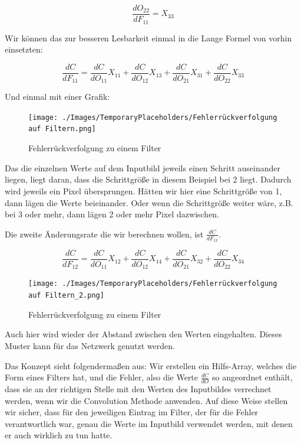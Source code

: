 \documentclass[12pt]{article}
\begin{document}
$$\frac{dO_{22}} {dF_{11}} = X_{33}$$

Wir können das zur besseren Lesbarkeit einmal in die Lange Formel von vorhin einsetzten:

$$
\frac{dC}{dF_{11}} = 
\frac{dC} {dO_{11}} X_{11}+
\frac{dC} {dO_{12}} X_{13}+
\frac{dC} {dO_{21}} X_{31}+
\frac{dC} {dO_{22}} X_{33}
$$

Und einmal mit einer Grafik:

\begin{figure}[H]
\centering
\texttt{[image: ./Images/TemporaryPlaceholders/Fehlerrückverfolgung auf Filtern.png]}
\caption{Fehlerrückverfolgung zu einem Filter}
\label{Fehlerrückverfolgung zu einem Filter v1}
\end{figure}

Das die einzelnen Werte auf dem Inputbild jeweils einen Schritt auseinander liegen, liegt daran, dass die Schrittgröße in diesem Beispiel bei 2 liegt. Dadurch wird jeweils ein Pixel übersprungen. Hätten wir hier eine Schrittgröße von 1, dann lägen die Werte beieinander. Oder wenn die Schrittgröße weiter wäre, z.B. bei 3 oder mehr, dann lägen 2 oder mehr Pixel dazwischen.

Die zweite Änderungsrate die wir berechnen wollen, ist $\frac{dC}{dF_{12}}$. 


$$
\frac{dC}{dF_{12}} = 
\frac{dC} {dO_{11}} X_{12}+
\frac{dC} {dO_{12}} X_{14}+
\frac{dC} {dO_{21}} X_{32}+
\frac{dC} {dO_{22}} X_{34}
$$

\begin{figure}[H]
\centering
\texttt{[image: ./Images/TemporaryPlaceholders/Fehlerrückverfolgung auf Filtern\_2.png]}
\caption{Fehlerrückverfolgung zu einem Filter}
\label{Fehlerrückverfolgung zu einem Filter v2}
\end{figure}

Auch hier wird wieder der Abstand zwischen den Werten eingehalten. Dieses Muster kann für das Netzwerk genutzt werden. 

Das Konzept sieht folgendermaßen aus: Wir erstellen ein Hilfs-Array, welches die Form eines Filters hat, und die Fehler, also die Werte $\frac{dC} {dO}$ so angeordnet enthält, dass sie an der richtigen Stelle mit den Werten des Inputbildes verrechnet werden, wenn wir die Convolution Methode anwenden. Auf diese Weise stellen wir sicher, dass für den jeweiligen Eintrag im Filter, der für die Fehler verantwortlich war, genau die Werte im Inputbild verwendet werden, mit denen er auch wirklich zu tun hatte.
\end{document}
